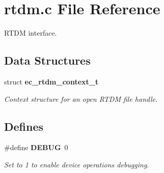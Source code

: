 \section{rtdm.\-c \-File \-Reference}
\label{rtdm_8c}


\-R\-T\-D\-M interface.  


\subsection*{\-Data \-Structures}
\begin{DoxyCompactItemize}
\item 
struct {\bf ec\-\_\-rtdm\-\_\-context\-\_\-t}
\begin{DoxyCompactList}\small\item\em \-Context structure for an open \-R\-T\-D\-M file handle. \end{DoxyCompactList}\end{DoxyCompactItemize}
\subsection*{\-Defines}
\begin{DoxyCompactItemize}
\item 
\#define {\bf \-D\-E\-B\-U\-G}~0\label{rtdm_8c_ad72dbcf6d0153db1b8d8a58001feed83}

\begin{DoxyCompactList}\small\item\em \-Set to 1 to enable device operations debugging. \end{DoxyCompactList}\end{DoxyCompactItemize}
